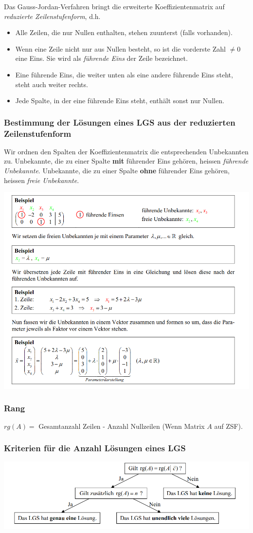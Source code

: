 Das Gauss-Jordan-Verfahren bringt die erweiterte Koeffizientenmatrix auf \textit{reduzierte Zeilenstufenform}, d.h.
\begin{itemize}
  \item Alle Zeilen, die nur Nullen enthalten, stehen zuunterst (falls vorhanden).
  \item Wenn eine Zeile nicht nur aus Nullen besteht, so ist die vorderste Zahl $\neq 0$ eine Eins. Sie wird als \textit{führende Eins} der Zeile bezeichnet.
  \item Eine führende Eins, die weiter unten als eine andere führende Eins steht, steht auch weiter rechts.
  \item Jede Spalte, in der eine führende Eins steht, enthält sonst nur Nullen.
\end{itemize}

\subsubsection{Bestimmung der Lösungen eines LGS aus der reduzierten Zeilenstufenform}%
\label{ssub:Bestimmung der Lösungen eines LGS aus der reduzierten Zeilenstufenform}
Wir ordnen den Spalten der Koeffizientenmatrix die entsprechenden Unbekannten zu. Unbekannte, die zu einer Spalte \textbf{mit} führender Eins gehören, heissen \textit{führende Unbekannte}. Unbekannte, die zu einer Spalte \textbf{ohne} führender Eins gehören, heissen \textit{freie Unbekannte}.
\begin{center}
  \includegraphics[width=0.8\linewidth]{images/lgs_zsf.png}
\end{center}

\subsubsection{Rang}%
\label{ssub:Rang}
$rg(A)=$ Gesamtanzahl Zeilen - Anzahl Nullzeilen (Wenn Matrix $A$ auf ZSF).

\subsubsection{Kriterien für die Anzahl Lösungen eines LGS}%
\label{ssub:Kriterien für die Anzahl Lösungen eines LGS}
\begin{center}
  \includegraphics[width=0.8\linewidth]{images/kriterien.png}
\end{center}


